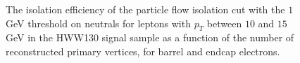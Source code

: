 \begin{figure}[!htbp]
\begin{center}
\caption{The isolation efficiency of the particle flow isolation cut with the $1$GeV threshold on neutrals
for leptons with $p_{T}$ between $10$ and $15$ GeV in the HWW130 signal sample as a function of the 
number of reconstructed primary vertices, for barrel and endcap electrons.  }
\label{fig:EleIsoEffVsNVtx_PFIso_Pt10To15}
\end{center}
\end{figure}

